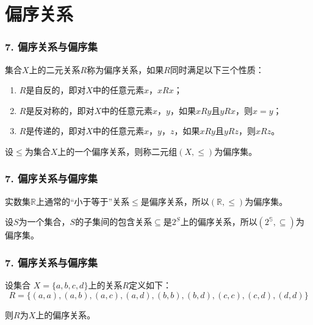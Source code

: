 \documentclass{beamer}
\begin{document}
\begin{CJK*}{UTF8}{gbsn}
\begin{frame}
\end{frame}

\section{偏序关系}
\begin{frame}
  \frametitle{7. 偏序关系与偏序集}
  \begin{Def}
    集合$X$上的二元关系$R$称为\alert{偏序关系}，如果$R$同时满足以下三个性质：
    \begin{enumerate}[(1)]
    \item $R$是自反的，即对$X$中的任意元素$x$，$xRx$；
    \item $R$是反对称的，即对$X$中的任意元素$x$，$y$，如果$xRy$且$yRx$，则$x=y$；
    \item $R$是传递的，即对$X$中的任意元素$x$，$y$，$z$，如果$xRy$且$yRz$，则$xRz$。
    \end{enumerate}
  \end{Def}\pause
    \begin{Def}
    设$\leq$为集合$X$上的一个偏序关系，则称二元组$(X,\leq)$为\alert{偏序集}。
  \end{Def}
\end{frame}

\begin{frame}
  \frametitle{7. 偏序关系与偏序集}
  \begin{Ex}
    实数集$\mathbb{R}$上通常的“小于等于”关系$\leq$是偏序关系，所以$(\mathbb{R},\leq)$为偏序集。
  \end{Ex}
  \begin{Ex}
    设$S$为一个集合，$S$的子集间的包含关系$\subseteq$是$2^S$上的偏序关系，所以$(2^{\mathbb{S}},\subseteq)$为偏序集。
  \end{Ex}
\end{frame}

\begin{frame}
  \frametitle{7. 偏序关系与偏序集}
  \begin{Ex}
    设集合
    $X=\{a,b,c,d\}$上的关系$R$定义如下：
    \begin{equation*}
      R=\{(a,a),(a,b),(a,c),(a,d),(b,b),(b,d),(c,c),(c,d),(d,d)\}
    \end{equation*}
  \end{Ex}
  则$R$为$X$上的偏序关系。
\end{frame}


\end{CJK*}
\end{document}
